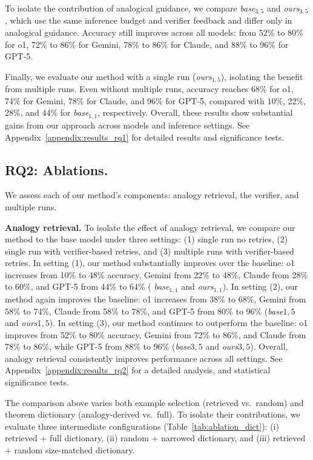 To isolate the contribution of analogical guidance, we compare \textit{base}$_{3,5}$ and \textit{ours}$_{3,5}$, which use the same inference budget and verifier feedback and differ only in analogical guidance. Accuracy still improves across all models: from 52\% to 80\% for o1, 72\% to 86\% for Gemini, 78\% to 86\% for Claude, and 88\% to 96\% for GPT-5.

Finally, we evaluate our method with a single run (\textit{ours}$_{1,5}$), isolating the benefit from multiple runs. Even without multiple runs, accuracy reaches 68\% for o1, 74\% for Gemini, 78\% for Claude, and 96\% for GPT-5, compared with 10\%, 22\%, 28\%, and 44\% for \textit{base}$_{1,1}$, respectively. Overall, these results show substantial gains from our approach across models and inference settings. See Appendix~\ref{appendix:results_rq1} for detailed results and significance tests.





\subsection{RQ2: Ablations.}
We assess each of our method’s components: analogy retrieval, the verifier, and multiple runs.

\noindent\textbf{Analogy retrieval.}
To isolate the effect of analogy retrieval, we compare our method to the base model under three settings: 
(1) single run no retries, 
(2) single run with verifier-based retries, and 
(3) multiple runs with verifier-based retries.
In setting (1), our method substantially improves over the baseline: o1 increases from 10\% to 48\% accuracy, Gemini from 22\% to 48\%, Claude from 28\% to 60\%, and GPT-5 from 44\% to 64\% ( \textit{base}$_{1,1}$ and \textit{ours}$_{1,1}$).
In setting (2), our method again improves the baseline: o1 increases from 38\% to 68\%, Gemini from 58\% to 74\%, Claude from 58\% to 78\%, and GPT-5 from 80\% to 96\% (\textit{base}${1,5}$ and \textit{ours}${1,5}$).
In setting (3), our method continues to outperform the baseline: o1 improves from 52\% to 80\% accuracy, Gemini from 72\% to 86\%, and Claude from 78\% to 86\%, while GPT-5 from 88\% to 96\% (\textit{base}${3,5}$ and \textit{ours}${3,5}$).
Overall, analogy retrieval consistently improves performance across all settings. See Appendix~\ref{appendix:results_rq2} for a detailed analysis, and statistical significance tests.



The comparison above varies both example selection (retrieved vs.\ random) and theorem dictionary (analogy-derived vs.\ full). To isolate their contributions, we evaluate three intermediate configurations (Table~\ref{tab:ablation_dict}): (i) retrieved + full dictionary, (ii) random + narrowed dictionary, and (iii) retrieved + random size-matched dictionary. 

